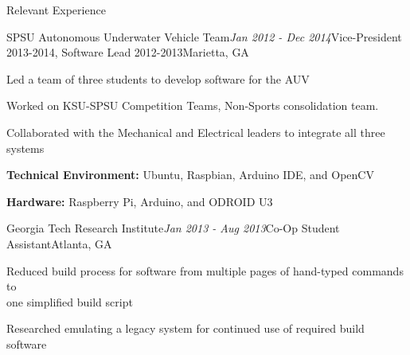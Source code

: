\begin{rSection}{Relevant Experience}

\begin{rSubsection}{SPSU Autonomous Underwater Vehicle Team}{\em Jan 2012 - Dec 2014}{Vice-President 2013-2014, Software Lead 2012-2013}{Marietta, GA}
\item Led a team of three students to develop software for the AUV
\item Worked on KSU-SPSU Competition Teams, Non-Sports consolidation team.
\item Collaborated with the Mechanical and Electrical leaders to integrate all three systems
\item \textbf{Technical Environment:} Ubuntu, Raspbian, Arduino IDE, and OpenCV
\item \textbf{Hardware:} Raspberry Pi, Arduino, and ODROID U3
\end{rSubsection}

\begin{rSubsection}{Georgia Tech Research Institute}{\em Jan 2013 - Aug 2013}{Co-Op Student Assistant}{Atlanta, GA}
\item Reduced build process for software from multiple pages of hand-typed commands to \\
one simplified build script
\item Researched emulating a legacy system for continued use of required build software
\end{rSubsection}

\end{rSection}